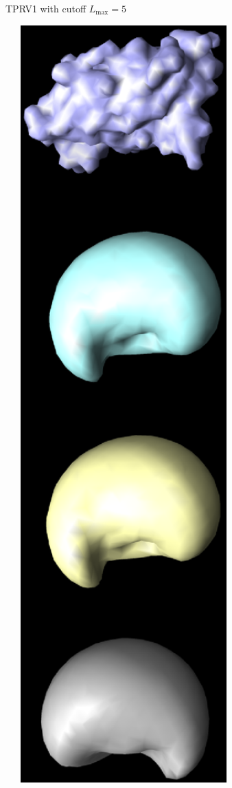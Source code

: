 \documentclass[12pt]{article}
\newcommand{\1}{\mathbf{1}}
\theoremstyle{plain}
\theoremstyle{definition}
\theoremstyle{remark}
\theoremstyle{plain}
\theoremstyle{remark}
\theoremstyle{plain}
\theoremstyle{plain}
\begin{document}
\begin{figure}[h]
\begin{subfigure}[h]{0.45\textwidth}
		\caption{TPRV1 with cutoff $L_{\text{max}}=5$}\label{fig:TRPV1_recon}
	\end{subfigure}
	\hfill
	\begin{subfigure}[h]{0.45\textwidth}
		\centering
		\includegraphics[angle=270, width=1\textwidth]{BPTI_maxL2_L20_resize.eps}

\end{subfigure}
\end{figure}
\end{document}
